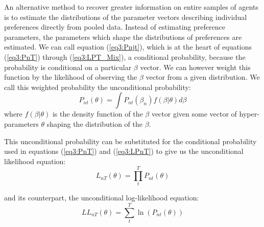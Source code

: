 \documentclass[../main.tex]{subfiles}
\begin{document}
An alternative method to recover greater information on entire samples of agents is to estimate the distributions of the parameter vectors describing individual preferences directly from pooled data.
Instead of estimating preference parameters, the parameters which shape the distributions of preferences are estimated.
We can call equation (\ref{eq3:Pnjt}), which is at the heart of equations (\ref{eq3:PnT}) through (\ref{eq3:LPT_Mix}), a conditional probability, because the probability is conditional on a particular $\beta$ vector.
We can however weight this function by the likelihood of observing the $\beta$ vector from a given distribution.{\footnotemark}
We call this weighted probability the unconditional probability:
\begin{equation}
	\label{eq3:Pnt}
	P_{nt}(\theta) = \int P_{nt}(\beta_n) f(\beta | \theta) d\beta	
\end{equation}
\noindent where $f(\beta|\theta)$ is the density function of the $\beta$ vector given some vector of hyper-parameters $\theta$ shaping the distribution of the $\beta$.

\addtocounter{footnote}{-1}

This unconditional probability can be substituted for the conditional probability used in equations (\ref{eq3:PnT}) and (\ref{eq3:LPnT}) to give us the unconditional likelihood equation:
\begin{equation}
	\label{eq3:LnT}
	L_{nT}(\theta) = \prod_t^T P_{nt}(\theta)
\end{equation}

\noindent and its counterpart, the unconditional log-likelihood equation:
\begin{equation}
	\label{eq3:LLnT}
	\mathit{LL}_{nT}(\theta) = \sum_t^T \ln \left( P_{nt}(\theta) \right)
\end{equation}
\end{document}
